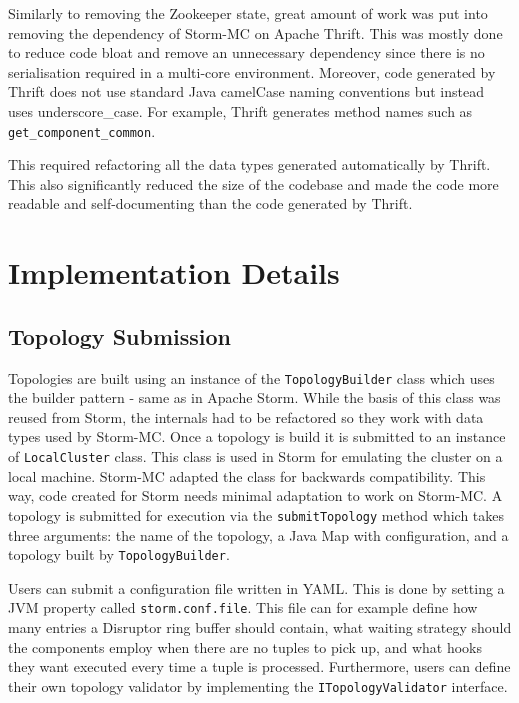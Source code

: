 Similarly to removing the Zookeeper state, great amount of work was put into removing the dependency of Storm-MC on Apache Thrift. This was mostly done to reduce code bloat and remove an unnecessary dependency since there is no serialisation required in a multi-core environment. Moreover, code generated by Thrift does not use standard Java camelCase naming conventions but instead uses underscore\_case. For example, Thrift generates method names such as \\ \texttt{get\_component\_common}.

This required refactoring all the data types generated automatically by Thrift. This also significantly reduced the size of the codebase and made the code more readable and self-documenting than the code generated by Thrift.

\section{Implementation Details}

\subsection{Topology Submission}

Topologies are built using an instance of the \texttt{TopologyBuilder} class which uses the builder pattern - same as in Apache Storm. While the basis  of this class was reused from Storm, the internals had to be refactored so they work with data types used by Storm-MC. Once a topology is build it is submitted to an instance of \texttt{LocalCluster} class. This class is used in Storm for emulating the cluster on a local machine. Storm-MC adapted the class for backwards compatibility. This way, code created for Storm needs minimal adaptation to work on Storm-MC. A topology is submitted for execution via the \texttt{submitTopology} method which takes three arguments: the name of the topology, a Java Map with configuration, and a topology built by \texttt{TopologyBuilder}.

Users can submit a configuration file written in YAML. This is done by setting a JVM property called \texttt{storm.conf.file}. This file can for example define how many entries a Disruptor ring buffer should contain, what waiting strategy should the components employ when there are no tuples to pick up, and what hooks they want executed every time a tuple is processed. Furthermore, users can define their own topology validator by implementing the \texttt{ITopologyValidator} interface.

